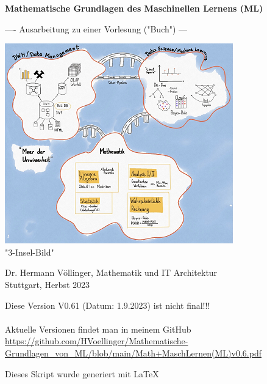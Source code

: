 \documentclass[12pt]{article}
\begin{document}

\begin{titlepage}
   \begin{center}
   \LARGE  
   \vspace{1.0cm}
       
   \textbf{Mathematische Grundlagen des Maschinellen Lernens (ML)}

   \vspace{1.0cm}
  
   \large       
   ---- Ausarbeitung zu einer Vorlesung ("Buch") ---
       
   
   \vspace{1.0cm}
   
   \includegraphics{DWH-Zeichnung}\\
   \small "3-Insel-Bild"  
       
   \vfill
   \large   
   
   Dr. Hermann Völlinger, Mathematik und IT Architektur
           \\ Stuttgart, Herbst 2023     

   \vspace{0.6cm}
        
   \end{center}
   
\begin{center}
Diese Version V0.61 (Datum: 1.9.2023) ist nicht final!!! \\
{\color{red}{(Beachte: ************ Kommentare *********)}} \\[0.3cm]
Aktuelle Versionen findet man in meinem GitHub\\[0.1cm]
\url{https://github.com/HVoellinger/Mathematische-Grundlagen_von_ML/blob/main/Math+MaschLernen(ML)v0.6.pdf} \\
\vspace{0.4cm}
\begin{large}
Dieses Skript wurde generiert mit \LaTeX\  
\end{large}
\end{center}


\end{titlepage}
\end{document}
